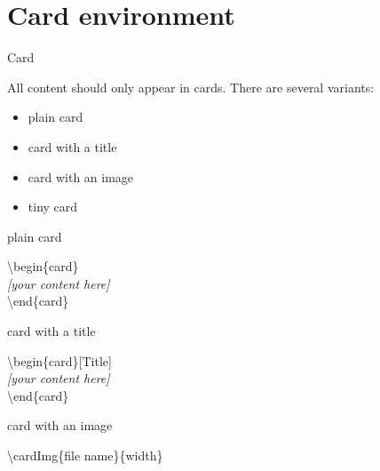\documentclass[9pt, aspectratio=169]{beamer}
\begin{document}
\section{Card environment}
\begin{frame}{Card}
\begin{card}
All content should only appear in cards. There are several variants:
\begin{itemize}
\item plain card
\item card with a title
\item card with an image
\item tiny card
\end{itemize}
\end{card}
\end{frame}

\begin{frame}{plain card}
\begin{card}
\end{card}

\begin{card}
{\color{primary} \textbackslash begin\{card\}\\[2mm]}
\null\qquad \textit{[your content here]}\\[2mm]
{\color{primary} \textbackslash end\{card\}}
\end{card}
\end{frame}

\begin{frame}{card with a title}
\begin{card}[Title]
\end{card}
\begin{alarm}[Title]
\end{alarm}
\begin{card}
{\color{primary} \textbackslash begin\{card\}[Title]\\[2mm]}
\null\qquad \textit{[your content here]}\\[2mm]
{\color{primary} \textbackslash end\{card\}}
\end{card}
\end{frame}

\begin{frame}{card with an image}
\centering
{}

\begin{card}
{\color{primary} \textbackslash cardImg\{file name\}\{width\}}
\end{card}
\end{frame}
\end{document}
